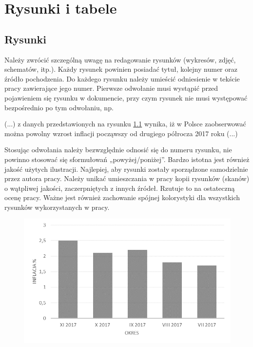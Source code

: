 \chapter{Rysunki i tabele}
\label{chap:rysunki_tabele}



\section{Rysunki}

Należy zwrócić szczególną uwagę na redagowanie rysunków (wykresów, zdjęć, schematów, itp.). Każdy rysunek powinien posiadać tytuł, kolejny numer oraz źródło pochodzenia. Do każdego rysunku należy umieścić odniesienie w tekście pracy zawierające jego numer. Pierwsze odwołanie musi wystąpić przed pojawieniem się rysunku w dokumencie, przy czym rysunek nie musi występować bezpośrednio po tym odwołaniu, np.

(...) z danych przedstawionych na rysunku \ref{fig:inflacja} wynika, iż w Polsce zaobserwować można powolny wzrost inflacji począwszy od drugiego półrocza 2017 roku (...)

Stosując odwołania należy bezwzględnie odnosić się do numeru rysunku, nie powinno stosować się sformułowań „powyżej/poniżej”. Bardzo istotna jest również jakość użytych ilustracji. Najlepiej, aby rysunki zostały sporządzone samodzielnie przez autora pracy. Należy unikać umieszczania w pracy kopii rysunków (skanów) o wątpliwej jakości, zaczerpniętych z innych źródeł. Rzutuje to na ostateczną ocenę pracy. Ważne jest również zachowanie spójnej kolorystyki dla wszystkich rysunków wykorzystanych w pracy.

\begin{figure}[ht]
	\centering
	\includegraphics[width=150mm]{images/inflacja.png}
	\label{fig:inflacja}
\end{figure}

